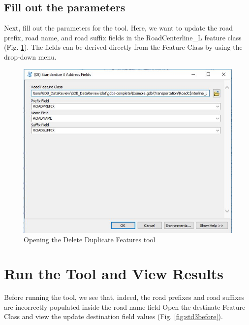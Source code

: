 \documentclass[openany]{book}
\theoremstyle{definition}
\theoremstyle{definition}
\theoremstyle{definition}
\theoremstyle{remark}
\begin{document}
\subsection{Fill out the parameters}\label{fill-out-the-parameters-7}

Next, fill out the parameters for the tool. Here, we want to update the
road prefix, road name, and road suffix fields in the RoadCenterline\_L
feature class (Fig. \ref{fig:std3params}). The fields can be derived
directly from the Feature Class by using the drop-down menu.

\begin{figure}[H]

{\centering \includegraphics{figures/std3-toolparams} 

}

\caption{Opening the Delete Duplicate Features tool}\label{fig:std3params}
\end{figure}

\section{Run the Tool and View
Results}\label{run-the-tool-and-view-results-7}

Before running the tool, we see that, indeed, the road prefixes and road
suffixes are incorrectly populated inside the road name field Open the
destinate Feature Class and view the update destination field values
(Fig. \ref{fig:std3before}).
\end{document}
